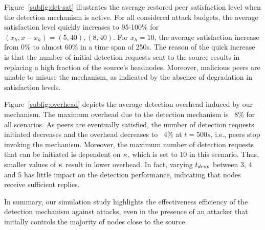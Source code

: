 Figure~\ref{subfig:det-sat} illustrates the average restored peer satisfaction level when the detection mechanism is active. 
For all considered attack budgets, the average satisfaction level quickly increases to 95-100\% for $(x_h, x-x_h)= (5,40), (8,40)$.
For $x_h=10$, the average satisfaction increase from 0\% to almost 60\% in a time span of 250s.
The reason of the quick increase is that the number of initial detection requests sent to the source results in replacing a high fraction of the source's headnodes. 
Moreover, malicious peers are unable to misuse the mechanism, as indicated by the absence of degradation in satisfaction levels. 

Figure~\ref{subfig:overhead} depicts the average detection overhead induced by our mechanism. 
The maximum overhead due to the detection mechanism is ~8\% for all scenarios.
As peers are eventually satisfied, the number of detection requests initiated decreases and the overhead decreases to ~4\% at $t=500s$, i.e., peers stop invoking the mechanism.
Moreover, the maximum number of detection requests that can be initiated is dependent on $\kappa$, which is set to 10 in this scenario.
Thus, smaller values of $\kappa$ result in lower overhead. 
In fact, varying $t_{drop}$ between 3, 4 and 5 has little impact on the detection performance, indicating that nodes receive sufficient replies.

In summary, our simulation study highlights the effectiveness efficiency of the detection mechanism against \drop attacks, even in the presence of an attacker that initially controls the majority of nodes close to the source. 
